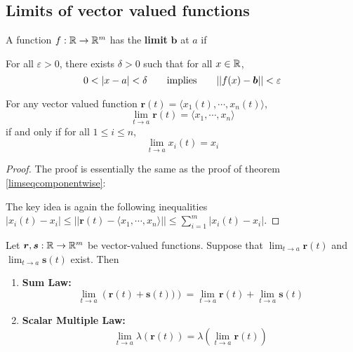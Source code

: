 \subsection{Limits of vector valued functions}\label{limvectorval}

\begin{definition}
    A function $f : \mathbb{R} \to \mathbb{R}^m$ has the \textbf{limit} $\bm{b}$ at $a$ if
    
    \vspace{1em}
    For all $\varepsilon>0$, there exists $\delta > 0$ such that for all $x \in \mathbb{R}$, $$0 < |x-a| < \delta \qquad \textnormal{implies} \qquad ||f(x) - \bm{b} || < \varepsilon$$
    
    \end{definition}


\begin{theorem}\label{vecvalcomponents}
    For any vector valued function $\bm{r}(t) = \langle x_1(t), \cdots, x_n(t) \rangle$, $$\lim_{t \to a} \bm{r}(t) = \langle x_1, \cdots, x_n \rangle$$ if and only if for all $1 \leq i \leq n$, $$\lim_{t \to a} x_i(t) = x_i$$
    
    
    \end{theorem}

    \begin{proof}
    The proof is essentially the same as the proof of theorem \ref{limseqcomponentwise}:
    
    The key idea is again the following inequalities $|x_i(t) - x_i| \leq ||\bm{r}(t) - \langle x_1, \cdots, x_n \rangle|| \leq \sum_{i=1}^m |x_i(t) - x_i|$.
    
    
    
    \end{proof}

    


\begin{theorem}
    Let $\bm{r},\bm{s} : \mathbb{R} \to \mathbb{R}^m$ be vector-valued functions. Suppose that $\lim_{t \to a}\bm{r}(t)$ and $\lim_{t \to a}\bm{s}(t)$ exist. Then 
    
    \begin{enumerate}
        \item \textbf{Sum Law:} $$\lim_{t \to a} \left(\bm{r}(t) + \bm{s}(t))\right) = \lim_{t \to a} \bm{r}(t) + \lim_{t \to a} \bm{s}(t)$$
        \item \textbf{Scalar Multiple Law:} $$\lim_{t \to a} \lambda(\bm{r}(t)) = \lambda \left(\lim_{t \to a} \bm{r}(t) \right)$$
    \end{enumerate}
    
    
    \end{theorem}



